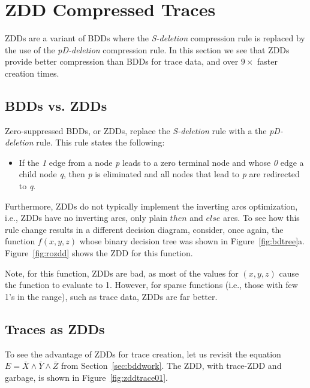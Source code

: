 \documentclass[defaultstyle,11pt]{thesis}
\begin{document}
\section{ZDD Compressed Traces}
\label{sec:zddwork}

ZDDs are a variant of BDDs where the \textit{S-deletion} compression
rule is replaced by the use of the \textit{pD-deletion} compression
rule.  In this section we see that ZDDs provide better compression
than BDDs for trace data, and over $9\times$ faster creation times.

\subsection{BDDs vs. ZDDs}

Zero-suppressed BDDs, or ZDDs, replace the \textit{S-deletion} rule with
a the \textit{pD-deletion} rule.  This rule states the following:
\begin{itemize}

\item If the \textit{1} edge from a node \textit{p} leads to a zero
  terminal node and whose \textit{0} edge a child node \textit {q}, then
  \textit{p} is eliminated and all nodes that lead to \textit{p} are
  redirected to \textit{q}.

\end{itemize}

Furthermore, ZDDs do not typically implement the inverting arcs
optimization, i.e., ZDDs have no inverting arcs, only plain $then$ and
$else$ arcs.  To see how this rule change results in a different
decision diagram, consider, once again, the function $f(x,y,z)$ whose
binary decision tree was shown in Figure~\ref{fig:bdtree}a.
Figure~\ref{fig:rozdd} shows the ZDD for this function.

Note, for this function, ZDDs are bad, as most of the values for
$(x,y,z)$ cause the function to evaluate to 1.  However, for sparse
functions (i.e., those with few 1's in the range), such as trace data,
ZDDs are far better.

\subsection{Traces as ZDDs}

To see the advantage of ZDDs for trace creation, let us revisit the
equation $E = \bar{X}\land\bar{Y}\land\bar{Z}$ from
Section~\ref{sec:bddwork}.  The ZDD, with trace-ZDD and garbage, is
shown in Figure~\ref{fig:zddtrace01}.
\end{document}
